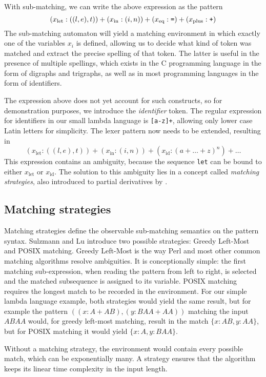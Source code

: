 With sub-matching, we can write the above expression as the pattern
%
\[(x_\text{let}:((l,e),t)) + (x_\text{in}:(i,n)) + (x_\text{eq}:\verb'=') +
(x_\text{plus}:\verb'+')\]
%
The sub-matching automaton will yield a matching environment in which exactly
one of the variables $x_i$ is defined, allowing us to decide what kind of token
was matched and extract the precise spelling of that token. The latter is useful
in the presence of multiple spellings, which exists in the C programming
language in the form of digraphs and trigraphs, as well as in most programming
languages in the form of identifiers.

The expression above does not yet account for such constructs, so for
demonstration purposes, we introduce the \textit{identifier} token. The regular
expression for identifiers in our small lambda language is \verb![a-z]+!,
allowing only lower case Latin letters for simplicity. The lexer pattern now
needs to be extended, resulting in
%
\[(x_\text{let}:((l,e),t)) + (x_\text{in}:(i,n)) + (x_\text{id}:(a+\dots+z)^n) +
\dots\]
%
This expression contains an ambiguity, because the sequence \verb!let! can be
bound to either $x_\text{let}$ or $x_\text{id}$. The solution to this ambiguity
lies in a concept called \textit{matching strategies}, also introduced to
partial derivatives by \cite{pdpat}.

\subsection{Matching strategies}

Matching strategies define the observable sub-matching semantics on the pattern
syntax. Sulzmann and Lu introduce two possible strategies: Greedy Left-Most and
POSIX matching. Greedy Left-Most is the way Perl and most other common matching
algorithms resolve ambiguities. It is conceptionally simple: the first matching
sub-expression, when reading the pattern from left to right, is selected and the
matched subsequence is assigned to its variable.
POSIX matching requires the longest match to be recorded in the environment. For
our simple lambda language example, both strategies would yield the same result,
but for example the pattern $((x:A+AB),(y:BAA+AA))$ matching the input $ABAA$
would, for greedy left-most matching, result in the match $\{x:AB, y:AA\}$, but
for POSIX matching it would yield $\{x:A, y:BAA\}$.

Without a matching strategy, the environment would contain every possible match,
which can be exponentially many. A strategy ensures that the algorithm keeps its
linear time complexity in the input length.


